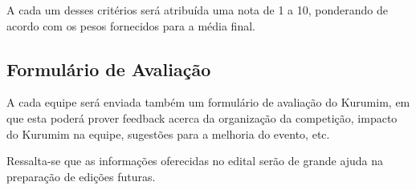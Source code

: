         A cada um desses critérios será atribuída uma nota de 1 a 10, ponderando de acordo com os pesos fornecidos para a média final.

    \subsection{Formulário de Avaliação}
        A cada equipe será enviada também um formulário de avaliação do Kurumim, em que esta poderá prover feedback acerca da organização da competição, impacto do Kurumim na equipe, sugestões para a melhoria do evento, etc.

        Ressalta-se que as informações oferecidas no edital serão de grande ajuda na preparação de edições futuras.